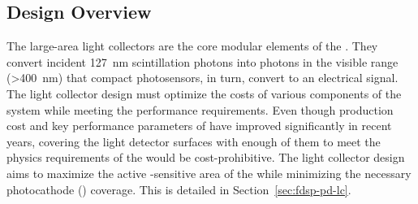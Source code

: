 \subsection{Design Overview} %
\label{sec:pds:des-ov}


 

The  large-area light collectors are the core modular elements of the .  They 
convert incident \SI{127}{nm} scintillation photons into photons in the visible range (>\SI{400}{nm}) that compact   photosensors, in turn,  convert to an electrical signal. The light collector design must optimize the costs of various components of the system while meeting the performance requirements.  %
Even though production cost and key performance parameters of  have improved significantly in recent years, covering the light detector surfaces with enough of them to meet the physics requirements of the  would be cost-prohibitive. 
The light collector design aims to maximize the active -sensitive area of the  while minimizing the necessary photocathode () coverage. This is detailed in
Section~\ref{sec:fdsp-pd-lc}.

